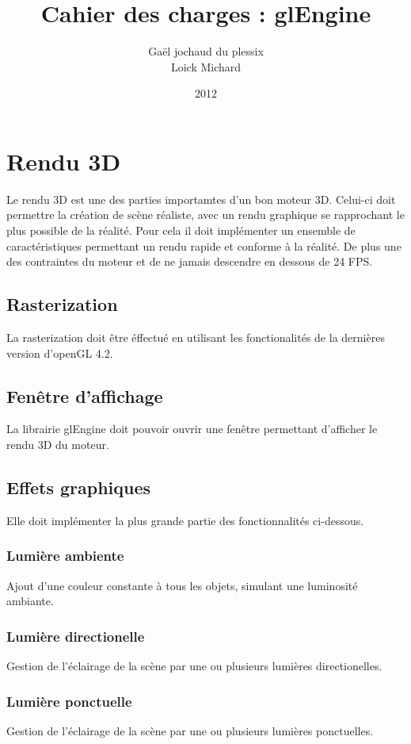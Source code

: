 \documentclass [a4 paper,11pt]{article}
\title {Cahier des charges : glEngine}
\author {Gaël jochaud du plessix\\
Loick Michard}
\date {2012}
\begin{document}
\maketitle

\section{Rendu 3D}

Le rendu 3D est une des parties importamtes d'un bon moteur 3D. 
Celui-ci doit permettre la création de scène réaliste, avec un rendu graphique se rapprochant le plus possible de la réalité.
Pour cela il doit implémenter un ensemble de caractéristiques permettant un rendu rapide et conforme à la réalité.
De plus une des contraintes du moteur et de ne jamais descendre en dessous de 24 FPS.

\subsection{Rasterization}
La rasterization doit être éffectué en utilisant les fonctionalités de la dernières version d'openGL 4.2.

\subsection{Fenêtre d'affichage}
La librairie glEngine doit pouvoir ouvrir une fenêtre permettant d'afficher le rendu 3D du moteur.

\subsection{Effets graphiques}

Elle doit implémenter la plus grande partie des fonctionnalités ci-dessous.

\subsubsection*{Lumière ambiente}
Ajout d'une couleur constante à tous les objets, simulant une luminosité ambiante.
\subsubsection*{Lumière directionelle}
Gestion de l'éclairage de la scène par une ou plusieurs lumières directionelles.
\subsubsection*{Lumière ponctuelle}
Gestion de l'éclairage de la scène par une ou plusieurs lumières ponctuelles.
\end{document}
